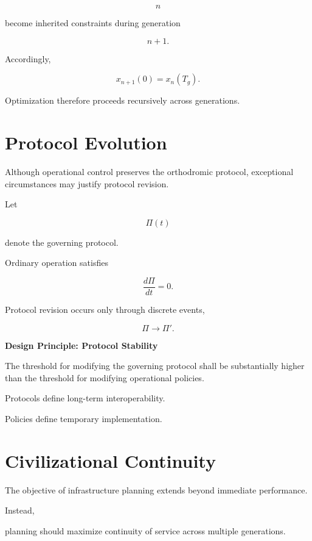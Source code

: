 \documentclass[11pt,fleqn]{book}
\numberwithin{equation}{chapter}
\newenvironment{principle}[1]
  {\begin{principleEnv}
   \noindent\textbf{Design Principle: #1}\par\smallskip\itshape}
  {\end{principleEnv}}
\theoremstyle{plain}
\theoremstyle{definition}
\theoremstyle{remark}
\begin{document}
\[
n
\]

become inherited constraints during generation

\[
n+1.
\]

Accordingly,

\[
x_{n+1}(0)
=
x_n(T_g).
\]

Optimization therefore proceeds recursively across generations.


\section{Protocol Evolution}

Although operational control preserves the orthodromic protocol,
exceptional circumstances may justify protocol revision.

Let

\[
\Pi(t)
\]

denote the governing protocol.

Ordinary operation satisfies

\[
\frac{d\Pi}{dt}
=
0.
\]

Protocol revision occurs only through discrete events,

\[
\Pi
\rightarrow
\Pi'.
\]


\begin{principle}{Protocol Stability}

The threshold for modifying the governing protocol shall be
substantially higher than the threshold for modifying operational
policies.

Protocols define long-term interoperability.

Policies define temporary implementation.

\end{principle}


\section{Civilizational Continuity}

The objective of infrastructure planning extends beyond immediate
performance.

Instead,

planning should maximize continuity of service across multiple
generations.
\end{document}
